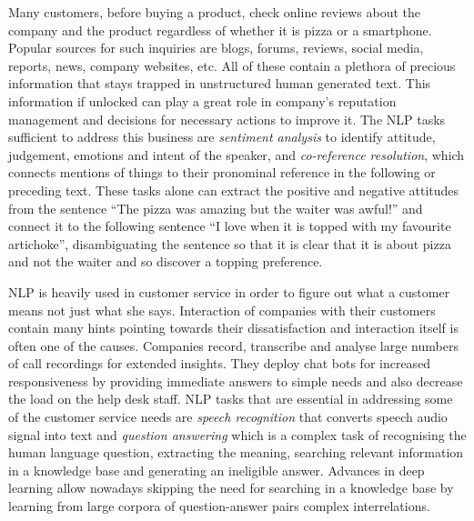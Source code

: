     
    Many customers, before buying a product, check online reviews about the company and the product regardless of whether it is pizza or a smartphone. Popular sources for such inquiries are blogs, forums, reviews, social media, reports, news, company websites, etc. All of these contain a plethora of precious information that stays trapped in unstructured human generated text. This information if unlocked can play a great role in company's reputation management and decisions for necessary actions to improve it. The NLP tasks sufficient to address this business are \textit{sentiment analysis} to identify attitude, judgement, emotions and intent of the speaker, and \textit{co-reference resolution}, which connects mentions of things to their pronominal reference in the following or preceding text. These tasks alone can extract the positive and negative attitudes from the sentence ``The pizza was amazing but the waiter was awful!'' and connect it to the following sentence ``I love when it is topped with my favourite artichoke'', disambiguating the sentence so that it is clear that it is about pizza and not the waiter and so discover a topping preference.
    
    NLP is heavily used in customer service in order to figure out what a customer means not just what she says. Interaction of companies with their customers contain many hints pointing towards their dissatisfaction and interaction itself is often one of the causes. Companies record, transcribe and analyse large numbers of call recordings for extended insights. They deploy chat bots for increased responsiveness by providing immediate answers to simple needs and also decrease the load on the help desk staff. NLP tasks that are essential in addressing some of the customer service needs are \textit{speech recognition} that converts speech audio signal into text and \textit{question answering} which is a complex task of recognising the human language question, extracting the meaning, searching relevant information in a knowledge base and generating an ineligible answer. Advances in deep learning allow nowadays skipping the need for searching in a knowledge base by learning from large corpora of question-answer pairs complex interrelations. 
    
